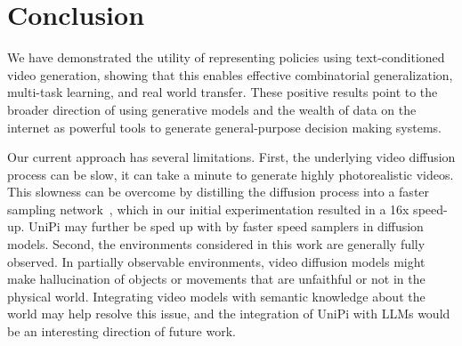 \section{Conclusion}\label{sec:conclusion}

We have demonstrated the utility of representing policies using text-conditioned video generation, showing that this enables effective combinatorial generalization, multi-task learning, and real world transfer. These positive results point to the broader direction of using generative models and the wealth of data on the internet as powerful tools to generate general-purpose decision making systems.

 Our current approach has several limitations. First, the underlying video diffusion process can be slow, it can take a minute to generate highly photorealistic videos. This slowness can be overcome by distilling the diffusion process into a faster sampling network~\citep{salimans2022progressive}, which in our initial experimentation resulted in a 16x speed-up. UniPi may further be sped up with by faster speed samplers in diffusion models. Second, the environments considered in this work are generally fully observed. In partially observable environments, video diffusion models might make hallucination of objects or movements that are unfaithful or not in the physical world. Integrating video models with semantic knowledge about the world may help resolve this issue, and the integration of UniPi with LLMs would be an interesting direction of future work.

